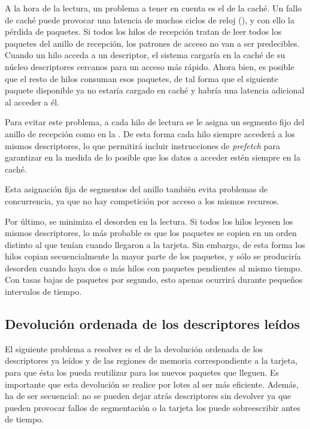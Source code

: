 \documentclass[twoside, 12pt]{epstfg}
\begin{document}
A la hora de la lectura, un problema a tener en cuenta es el de la caché. Un fallo de caché puede provocar una latencia de muchos ciclos de reloj (), y con ello la pérdida de paquetes. Si todos los hilos de recepción tratan de leer todos los paquetes del anillo de recepción, los patrones de acceso no van a ser predecibles. Cuando un hilo acceda a un descriptor, el sistema cargaría en la caché de su núcleo descriptores cercanos para un acceso más rápido. Ahora bien, es posible que el resto de hilos consuman esos paquetes, de tal forma que el siguiente paquete disponible ya no estaría cargado en caché y habría una latencia adicional al acceder a él.

Para evitar este problema, a cada hilo de lectura se le asigna un segmento fijo del anillo de recepción como en la . De esta forma cada hilo siempre accederá a los mismos descriptores, lo que permitirá incluir instrucciones de \textit{prefetch} para garantizar en la medida de lo posible que los datos a acceder estén siempre en la caché.

Esta asignación fija de segmentos del anillo también evita problemas de concurrencia, ya que no hay competición por acceso a los mismos recursos.

Por último, se minimiza el desorden en la lectura. Si todos los hilos leyesen los mismos descriptores, lo más probable es que los paquetes se copien en un orden distinto al que tenían cuando llegaron a la tarjeta. Sin embargo, de esta forma los hilos copian secuencialmente la mayor parte de los paquetes, y sólo se produciría desorden cuando haya dos o más hilos con paquetes pendientes al mismo tiempo. Con tasas bajas de paquetes por segundo, esto apenas ocurrirá durante pequeños intervalos de tiempo.

\subsection{Devolución ordenada de los descriptores leídos}

El siguiente problema a resolver es el de la devolución ordenada de los descriptores ya leídos y de las regiones de memoria correspondiente a la tarjeta, para que ésta los pueda reutilizar para los nuevos paquetes que lleguen. Es importante que esta devolución se realice por lotes al ser más eficiente. Además, ha de ser secuencial: no se pueden dejar atrás descriptores sin devolver ya que pueden provocar fallos de segmentación o la tarjeta los puede sobreescribir antes de tiempo.
\end{document}
